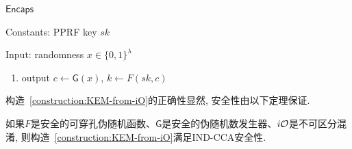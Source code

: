 \begin{framed}
\begin{minipage}[center]{\textwidth}
\begin{center}
    $\mathsf{Encaps}$
\end{center}
\vspace{-1em}
\begin{trivlist}
    \item Constants: PPRF key $sk$
    
    \item Input: randomness $x \in \{0,1\}^\lambda$ 
        \begin{enumerate}\itemsep 1pt \parskip 0pt \parsep 0pt
            \item output $c \leftarrow \mathsf{G}(x)$, $k \leftarrow F(sk, c)$
        \end{enumerate}
\end{trivlist}
\end{minipage}
\end{framed}

构造~\ref{construction:KEM-from-iO}的正确性显然, 安全性由以下定理保证.
\begin{theorem}
    如果$F$是安全的可穿孔伪随机函数、$\mathsf{G}$是安全的伪随机数发生器、$i\mathcal{O}$是不可区分混淆, 则构造~\ref{construction:KEM-from-iO}满足IND-CCA安全性.
\end{theorem} 

